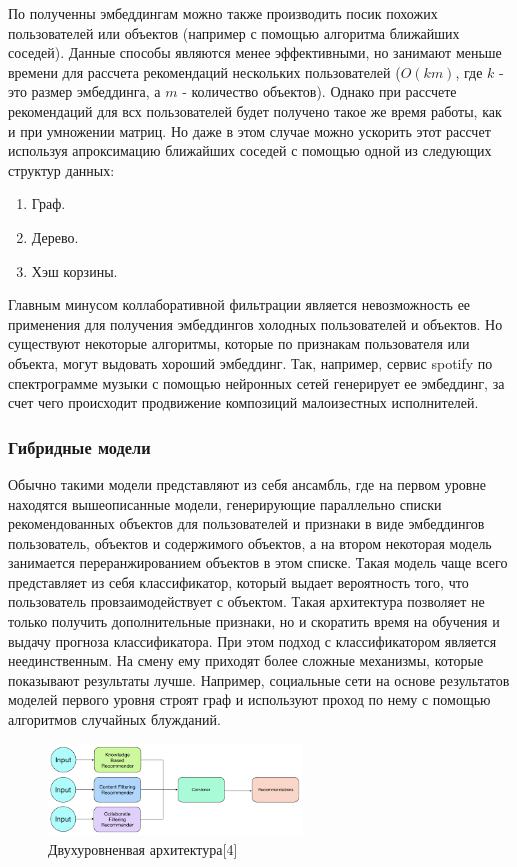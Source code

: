 \documentclass[bachelor, och, coursework]{SCWorks}
\begin{document}
По полученны эмбеддингам можно также производить посик похожих пользователей или объектов (например с
помощью алгоритма ближайших соседей). Данные способы являются менее эффективными, но занимают меньше
времени для рассчета рекомендаций нескольких пользователей ($O(km)$, где $k$ - это размер эмбеддинга,
а $m$ - количество объектов). Однако при рассчете рекомендаций для всх пользователей будет получено
такое же время работы, как и при умножении матриц. Но даже в этом случае можно ускорить этот рассчет
используя апроксимацию ближайших соседей с помощью одной из следующих структур данных:

\begin{enumerate}
    \item Граф.
    \item Дерево.
    \item Хэш корзины.
\end{enumerate}

Главным минусом коллаборативной фильтрации является невозможность ее применения для получения эмбеддингов холодных
пользователей и объектов. Но существуют некоторые алгоритмы, которые по признакам пользователя или объекта,
могут выдовать хороший эмбеддинг. Так, например, сервис spotify по спектрограмме музыки с помощью нейронных сетей
генерирует ее эмбеддинг, за счет чего происходит продвижение композиций малоизестных исполнителей.

\subsubsection{Гибридные модели}
Обычно такими модели представляют из себя ансамбль, где на первом уровне находятся вышеописанные модели,
генерирующие параллельно списки рекомендованных объектов для пользователей и признаки в виде эмбеддингов
пользователь, объектов и содержимого объектов, а на втором некоторая модель занимается переранжированием объектов в этом списке.
Такая модель чаще всего представляет из себя классификатор, который выдает вероятность того, что пользователь провзаимодействует
с объектом. Такая архитектура позволяет не только получить дополнительные признаки, но и скоратить время
на обучения и выдачу прогноза классификатора. При этом подход с классификатором является неединственным.
На смену ему приходят более сложные механизмы, которые показывают результаты лучше. Например, социальные
сети на основе результатов моделей первого уровня строят граф и используют проход по нему с помощью
алгоритмов случайных блужданий.

\begin{figure}[H]
    \centering
    \includegraphics[width=0.6\textwidth]{pic/4}
    \caption{Двухуровненвая архитектура[4]}
    \label{fig:img1}
\end{figure}
\end{document}
